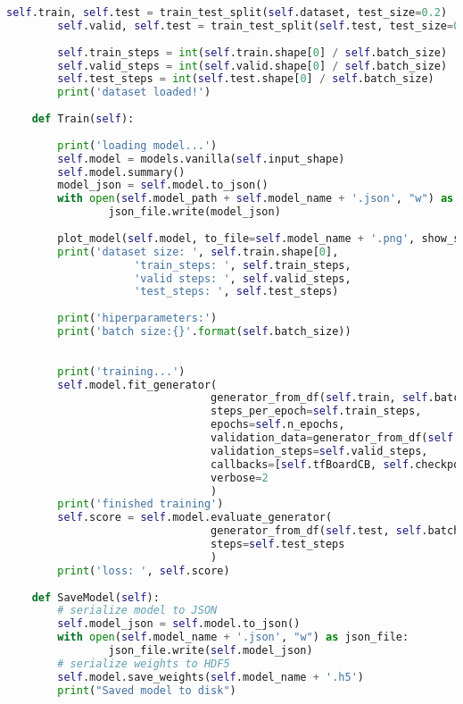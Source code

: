 \begin{lstlisting}[title={train\_model.py},language=Python]
        self.train, self.test = train_test_split(self.dataset, test_size=0.2)
        self.valid, self.test = train_test_split(self.test, test_size=0.7)
        
        self.train_steps = int(self.train.shape[0] / self.batch_size)
        self.valid_steps = int(self.valid.shape[0] / self.batch_size)
        self.test_steps = int(self.test.shape[0] / self.batch_size)
        print('dataset loaded!')
    
    def Train(self):
    
        print('loading model...')
        self.model = models.vanilla(self.input_shape)
        self.model.summary()
        model_json = self.model.to_json()
        with open(self.model_path + self.model_name + '.json', "w") as json_file:
                json_file.write(model_json)
                
        plot_model(self.model, to_file=self.model_name + '.png', show_shapes=True)
        print('dataset size: ', self.train.shape[0],
                    'train_steps: ', self.train_steps, 
                    'valid steps: ', self.valid_steps, 
                    'test_steps: ', self.test_steps)
            
        print('hiperparameters:')
        print('batch size:{}'.format(self.batch_size))
            
    
        print('training...')
        self.model.fit_generator(
                                generator_from_df(self.train, self.batch_size, self.im_shape, 'angular'),
                                steps_per_epoch=self.train_steps, 
                                epochs=self.n_epochs,
                                validation_data=generator_from_df(self.valid, self.batch_size, self.im_shape, 'angular'),
                                validation_steps=self.valid_steps,
                                callbacks=[self.tfBoardCB, self.checkpointCB],
                                verbose=2
                                )
        print('finished training')
        self.score = self.model.evaluate_generator(
                                generator_from_df(self.test, self.batch_size, self.im_shape, 'angular'), 
                                steps=self.test_steps
                                )
        print('loss: ', self.score)
    
    def SaveModel(self):
        # serialize model to JSON
        self.model_json = self.model.to_json()
        with open(self.model_name + '.json', "w") as json_file:
                json_file.write(self.model_json)
        # serialize weights to HDF5
        self.model.save_weights(self.model_name + '.h5')
        print("Saved model to disk")
    

\end{lstlisting}
